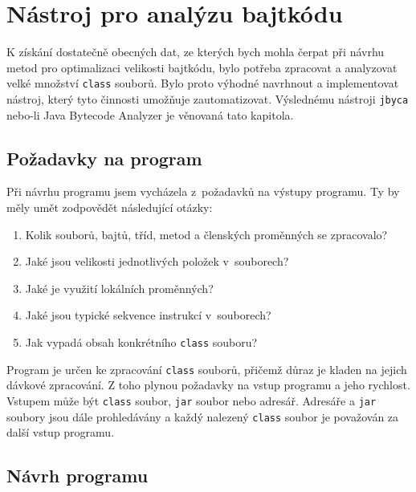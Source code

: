 \chapter{Nástroj pro analýzu bajtkódu}\label{Jbyca}


K získání dostatečně obecných dat, ze kterých bych mohla čerpat při návrhu metod pro optimalizaci velikosti bajtkódu, bylo potřeba zpracovat a analyzovat velké množství \texttt{class} souborů. Bylo proto výhodné navrhnout a implementovat nástroj, který tyto činnosti umožňuje zautomatizovat. Výslednému nástroji \texttt{jbyca} nebo-li Java Bytecode Analyzer je věnovaná tato kapitola.

\section{Požadavky na program}\label{Jbyca:Requirements}


Při návrhu programu jsem vycházela z~požadavků na výstupy programu.
Ty by měly umět zodpovědět následující otázky: 

\begin{enumerate}
\setlength{\itemsep}{0pt}
\setlength{\parskip}{0pt}
\item Kolik souborů, bajtů, tříd, metod a členských proměnných se zpracovalo? 
\item Jaké jsou velikosti jednotlivých položek v~souborech? 
\item Jaké je využití lokálních proměnných? 
\item Jaké jsou typické sekvence instrukcí v~souborech?
\item Jak vypadá obsah konkrétního \texttt{class} souboru? 
\end{enumerate}

Program je určen ke zpracování \texttt{class} souborů, přičemž důraz je kladen na jejich dávkové zpracování. Z toho plynou požadavky na vstup programu a jeho rychlost. Vstupem může být \texttt{class} soubor, \texttt{jar} soubor nebo adresář. Adresáře a \texttt{jar} soubory jsou dále prohledávány a každý nalezený \texttt{class} soubor je považován za další vstup programu. 

\section{Návrh programu}\label{Jbyca:Design}

